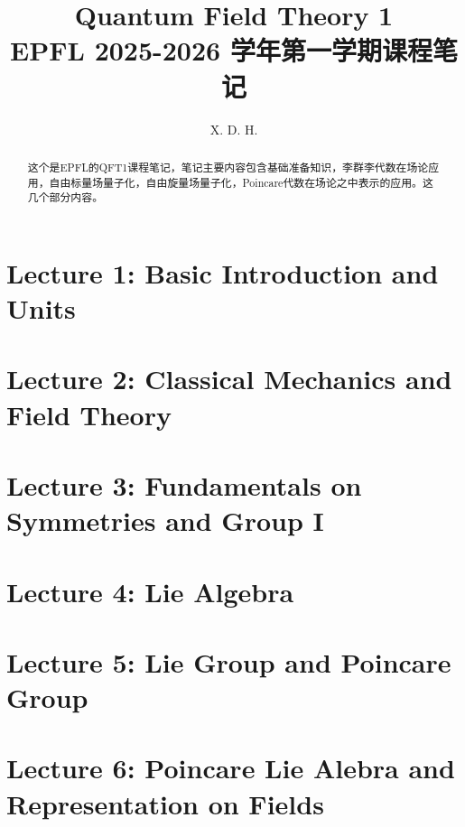 \documentclass[10pt]{article}
\begin{document}
\title{\boldmath Quantum Field Theory 1 \\ \large EPFL 2025-2026 学年第一学期课程笔记}
\author{X. D. H.}

\maketitle

\begin{abstract}
  这个是EPFL的QFT1课程笔记，笔记主要内容包含基础准备知识，李群李代数在场论应用，自由标量场量子化，自由旋量场量子化，Poincare代数在场论之中表示的应用。这几个部分内容。
\end{abstract}

\tableofcontents

\newpage
\section{Lecture 1: Basic Introduction and Units}\label{sec:Lecture 1} %


\newpage
\section{Lecture 2: Classical Mechanics and Field Theory}\label{sec:Lecture 2} %


\newpage
\section{Lecture 3: Fundamentals on Symmetries and Group I}\label{sec:Lecture 3: Fundamentals on Symmetries and Group I} %


\newpage
\section{Lecture 4: Lie Algebra}\label{sec:Lecture 4: Lie Algebra} %


\newpage 
\section{Lecture 5: Lie Group and Poincare Group}\label{sec:} %


\newpage
\section{Lecture 6: Poincare Lie Alebra and Representation on Fields}\label{sec:Lecture 6} %

\end{document}
